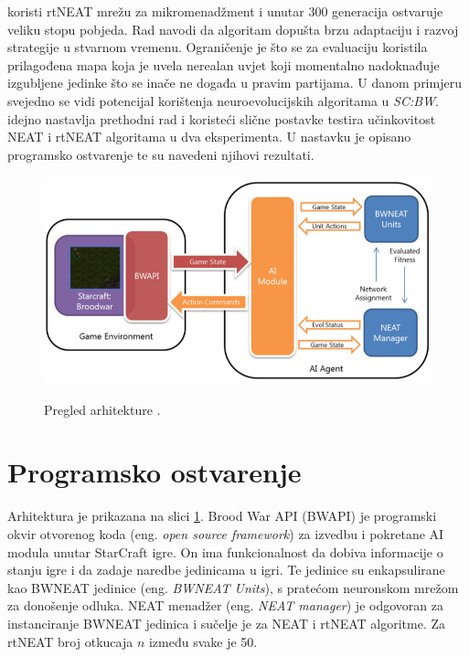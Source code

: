 \documentclass[times, utf8, seminar, numeric]{fer}
\begin{document}
\citep{rad1} koristi rtNEAT mrežu za mikromenadžment i unutar 300 generacija ostvaruje veliku stopu pobjeda. Rad navodi da algoritam dopušta brzu adaptaciju i razvoj strategije u stvarnom vremenu. Ograničenje je što se za evaluaciju koristila prilagođena mapa koja je uvela nerealan uvjet koji momentalno nadoknađuje izgubljene jedinke što se inače ne događa u pravim partijama. U danom primjeru svejedno se vidi potencijal korištenja neuroevolucijskih algoritama u \textit{SC:BW}. \citep{rad5} idejno nastavlja prethodni rad i koristeći slične postavke testira učinkovitost NEAT i rtNEAT algoritama u dva eksperimenta. U nastavku je opisano programsko ostvarenje \citep{rad5} te su navedeni njihovi rezultati.

\begin{figure}[ht]
  \centering
  \includegraphics[height=6cm]{slika5}\\
  \caption{Pregled arhitekture \citep{rad5}.}
  \label{slika5}
\end{figure}

\section{Programsko ostvarenje}
Arhitektura je prikazana na slici \ref{slika5}. Brood War API (BWAPI) je programski okvir otvorenog koda (eng. \textit{open source framework}) za izvedbu i pokretane AI modula unutar StarCraft igre. On ima funkcionalnost da dobiva informacije o stanju igre i da zadaje naredbe jedinicama u igri. Te jedinice su enkapsulirane kao BWNEAT jedinice (eng. \textit{BWNEAT Units}), s pratećom neuronskom mrežom za donošenje odluka. NEAT menadžer (eng. \textit{NEAT manager}) je odgovoran za instanciranje BWNEAT jedinica i sučelje je za NEAT i rtNEAT algoritme. Za rtNEAT broj otkucaja $n$ između svake je 50.
\end{document}
